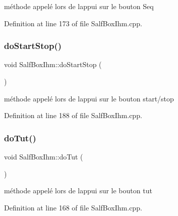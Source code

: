 méthode appelé lors de l\textquotesingle{}appui sur le bouton Seq 



Definition at line 173 of file Salf\+Box\+Ihm.\+cpp.

\mbox{\label{class_salf_box_ihm_ad5bc73201b44237264423a15596a0520}} 
\subsubsection{\texorpdfstring{do\+Start\+Stop()}{doStartStop()}}
{\footnotesize\ttfamily void Salf\+Box\+Ihm\+::do\+Start\+Stop (\begin{DoxyParamCaption}{ }\end{DoxyParamCaption})\hspace{0.3cm}{\ttfamily [static]}}



méthode appelé lors de l\textquotesingle{}appui sur le bouton start/stop 



Definition at line 188 of file Salf\+Box\+Ihm.\+cpp.

\mbox{\label{class_salf_box_ihm_ae665d726b6f7ad5bf72d1fc26893abf5}} 
\subsubsection{\texorpdfstring{do\+Tut()}{doTut()}}
{\footnotesize\ttfamily void Salf\+Box\+Ihm\+::do\+Tut (\begin{DoxyParamCaption}{ }\end{DoxyParamCaption})\hspace{0.3cm}{\ttfamily [static]}}



méthode appelé lors de l\textquotesingle{}appui sur le bouton tut 



Definition at line 168 of file Salf\+Box\+Ihm.\+cpp.

\mbox{\label{class_salf_box_ihm_aabf6bdbc268b0ab0097562284ad533fa}} 
